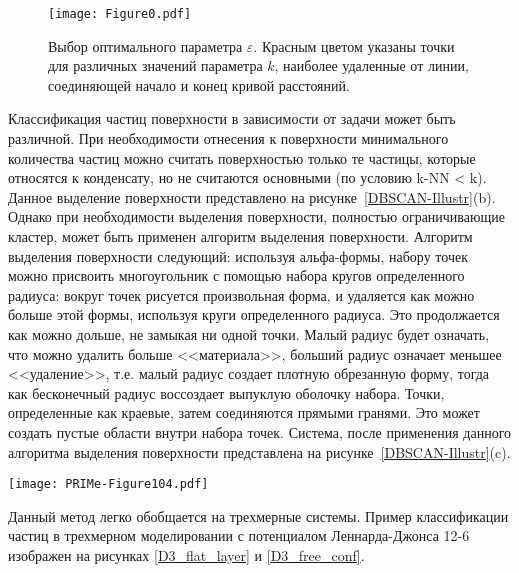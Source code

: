 \begin{figure}[!t]
    \centering
    \texttt{[image: Figure0.pdf]}
    \caption{Выбор оптимального параметра $\varepsilon$. Красным цветом указаны точки для различных значений параметра $k$, наиболее удаленные от линии, соединяющей начало и конец кривой расстояний.}
    \label{epsilon_k}
\end{figure}

Классификация частиц поверхности в зависимости от задачи может быть различной.
При необходимости отнесения к поверхности минимального количества частиц можно считать поверхностью только те частицы, которые относятся к конденсату, но не считаются основными (по условию k-NN < k).
Данное выделение поверхности представлено на рисунке~\ref{DBSCAN-Illustr}(b).
Однако при необходимости выделения поверхности, полностью ограничивающие кластер, может быть применен алгоритм выделения поверхности.
Алгоритм выделения поверхности следующий: используя альфа-формы, набору точек можно присвоить многоугольник с помощью набора кругов определенного радиуса: вокруг точек рисуется произвольная форма, и удаляется как можно больше этой формы, используя круги определенного радиуса.
Это продолжается как можно дольше, не замыкая ни одной точки.
Малый радиус будет означать, что можно удалить больше <<материала>>, больший радиус означает меньшее <<удаление>>, т.е. малый радиус создает плотную обрезанную форму, тогда как бесконечный радиус воссоздает выпуклую оболочку набора.
Точки, определенные как краевые, затем соединяются прямыми гранями.
Это может создать пустые области внутри набора точек.
Система, после применения данного алгоритма выделения поверхности представлена на рисунке~\ref{DBSCAN-Illustr}(c).

\begin{figure*}[!t]
    \centering
    \texttt{[image: PRIMe-Figure104.pdf]}
    \caption{Пример распознавания частиц в 2D системе LJ12-6. (a) результат работы метода DBSCAN (классификация частиц на конденсат и газ). (b) пример выделения частиц поверхности, по условию принадлежности к конденсату и не к основным частицам. Разные кластеры раскрашены в разные цвета с учетом регулярных граничных условий. (с) пример выделения регулярной поверхности, охватывающей все частицы кластера.}
    \label{DBSCAN-Illustr}
\end{figure*}

Данный метод легко обобщается на трехмерные системы. Пример классификации частиц в трехмерном моделировании с потенциалом Леннарда-Джонса 12-6 изображен на рисунках \ref{D3_flat_layer} и \ref{D3_free_conf}.

